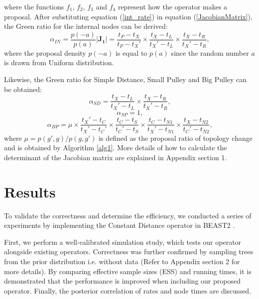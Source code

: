 \documentclass{bmcart}
\begin{document}
where the functions ${f_1}$, ${f_2}$, ${f_3}$ and ${f_4}$ represent how the operator makes a proposal. After substituting equation (\ref{int_rate}) in equation (\ref{JacobianMatrix}), the Green ratio for the internal nodes can be derived:
\begin{equation}\label{HR1}
{\alpha_{IN}} = \frac{{p ( - a)}}{{p (a)}}\left| {\mathbf{J_1}} \right| = \frac{{{t_P} - {t_X}}}{{{t_P} - {t_X}'}} \times \frac{{{t_X} - {t_L}}}{{{t_X}' - {t_L}}} \times \frac{{{t_X} - {t_R}}}{{{t_X}' - {t_R}}}\text{,}
\end{equation}
where the proposal density ${p ( - a)}$ is equal to ${p ( a )}$ since the random number $a$ is drawn from Uniform distribution.

Likewise, the Green ratio for Simple Distance, Small Pulley and  Big Pulley can be obtained:
\begin{equation}\label{HR2}
{\alpha_{SD}} = \frac{{{t_X} - {t_L}}}{{{t_X}' - {t_L}}} \times \frac{{{t_X} - {t_R}}}{{{t_X}' - {t_R}}}\text{,}
\end{equation}
\begin{equation}\label{HR3}
{\alpha_{SP}}  = 1\text{,}
\end{equation}
\begin{equation}\label{HR4}
{\alpha_{BP}} = \mu \times \frac{{{t_X}' - {t_C}}}{{{t_X}' - {t_C}'}} \times \frac{{{t_C} - {t_S}}}{{{t_C}' - {t_S}}} \times \frac{{{t_C} - {t_{N1}}}}{{{t_X}' - {t_{N1}}}} \times \frac{{{t_X} - {t_{N2}}}}{{{t_C}' - {t_{N2}}}}\text{,}
\end{equation}
where $\mu = p(g', g) / p(g, g')$ is defined as the proposal ratio of topology change and is obtained by Algorithm \ref{alg1}. More details of how to calculate the determinant of the Jacobian matrix are explained in Appendix section 1.

\section*{Results}
To validate the correctness and determine the efficiency, we conducted a series of experiments by implementing the Constant Distance operator in BEAST2 \cite{bouckaert2014beast}.

First, we perform a well-calibrated simulation study, which tests our operator alongside existing operators. Correctness was further confirmed by sampling trees from the prior distribution i.e. without data (Refer to Appendix section 2 for more details). By comparing effective sample sizes (ESS) \cite{Tracer} and running times, it is demonstrated that the performance is improved when including our proposed operator. Finally, the posterior correlation of rates and node times are discussed.
\end{document}
